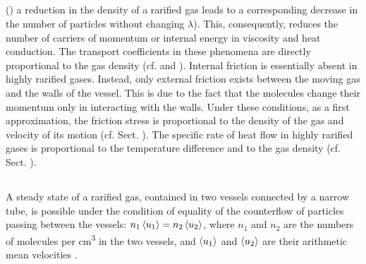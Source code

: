 \subsection{}\label{10.9.2}  () a reduction in the density of a rarified gas leads to a corresponding decrease in the number of particles without changing $\lambda$). This, conse­quently, reduces the number of carriers of momentum or inter­nal energy in viscosity and heat conduction. The transport coefficients in these phenomena are directly proportional to the gas density (cf.  and ). Internal friction is essentially absent in highly rarified gases. Instead, only exter­nal friction exists between the moving gas and the walls of the vessel. This is due to the fact that the molecules change their momentum only in interacting with the walls. Under these conditions, as a first approximation, the friction stress is proportional to the density of the gas and velocity of its motion (cf. Sect. ). The specific rate of heat flow in highly rarified gases is proportional to the temperature difference and to the gas density (cf. Sect. ).


\subsection{}\label{10.9.3} A steady state of a rarified gas, contained in two vessels connected by a narrow tube, is possible under the condition of equality of the counterflow of particles passing between the vessels: $n_{1}\expval{u_{1}} = n_{2} \expval{u_{2}}$, where $n_{1}$ and $n_{2}$ are the numbers of molecules per \si{\centi\meter\cubed} in the two vessels, and $\expval{u_{1}}$ and $\expval{u_{2}}$ are their arithmetic mean velocities .

